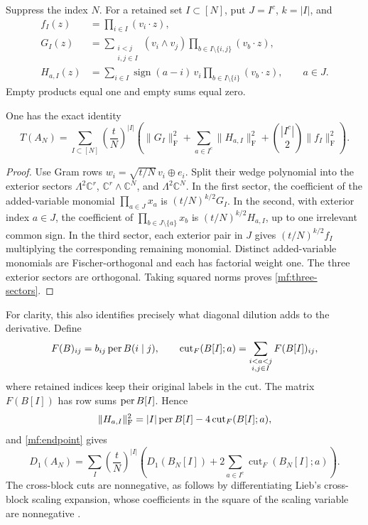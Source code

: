 Suppress the index \(N\). For a retained set \(I\subset[N]\), put
\(J=I^c\), \(k=|I|\), and
\begin{align*}
 f_I(z)&=\prod_{i\in I}(v_i\cdot z),\\
 G_I(z)&=\sum_{\substack{i<j\\i,j\in I}}
        (v_i\wedge v_j)\prod_{b\in I\setminus\{i,j\}}(v_b\cdot z),\\
 H_{a,I}(z)&=\sum_{i\in I}\operatorname{sign}(a-i)\,v_i
                       \prod_{b\in I\setminus\{i\}}(v_b\cdot z),
                       \qquad a\in J.
\end{align*}
Empty products equal one and empty sums equal zero.

\begin{lemma}\label{mf:sector-identity}
One has the exact identity
\begin{equation}\label{mf:three-sectors}
 T(A_N)=\sum_{I\subset[N]}\left(\frac tN\right)^{|I|}
 \left(
  \|G_I\|_{\mathrm F}^2+
  \sum_{a\in I^c}\|H_{a,I}\|_{\mathrm F}^2+
  \binom{|I^c|}{2}\|f_I\|_{\mathrm F}^2
 \right).
\end{equation}
\end{lemma}
\begin{proof}
Use Gram rows
\(w_i=\sqrt{t/N}\,v_i\oplus e_i\).
Split their wedge polynomial into the exterior sectors
\(\Lambda^2\mathbb C^r\), \(\mathbb C^r\wedge\mathbb C^N\), and
\(\Lambda^2\mathbb C^N\).
In the first sector, the coefficient of the added-variable monomial
\(\prod_{a\in J}x_a\) is \((t/N)^{k/2}G_I\).
In the second, with exterior index \(a\in J\), the coefficient of
\(\prod_{b\in J\setminus\{a\}}x_b\) is
\((t/N)^{k/2}H_{a,I}\), up to one irrelevant common sign.
In the third sector, each exterior pair in \(J\) gives
\((t/N)^{k/2}f_I\) multiplying the corresponding remaining monomial.
Distinct added-variable monomials are Fischer-orthogonal and each has
factorial weight one. The three exterior sectors are orthogonal.
Taking squared norms proves \eqref{mf:three-sectors}.
\end{proof}

For clarity, this also identifies precisely what diagonal dilution adds
to the derivative. Define
\[
 F(B)_{ij}=b_{ij}\operatorname{per} B(i\mid j),\qquad
 \operatorname{cut}_F(B[I];a)=
       \sum_{\substack{i<a<j\\i,j\in I}}F(B[I])_{ij},
\]
where retained indices keep their original labels in the cut.
The matrix \(F(B[I])\) has row sums \(\operatorname{per} B[I]\). Hence
\[
 \|H_{a,I}\|_{\mathrm F}^2
       =|I|\operatorname{per} B[I]-4\operatorname{cut}_F(B[I];a),
\]
and \eqref{mf:endpoint} gives
\begin{equation}\label{mf:derivative-dilution}
 D_1(A_N)=\sum_I\left(\frac tN\right)^{|I|}
 \left(D_1(B_N[I])
          +2\sum_{a\in I^c}\operatorname{cut}_F(B_N[I];a)\right).
\end{equation}
The cross-block cuts are nonnegative, as follows by differentiating
Lieb's cross-block scaling expansion, whose coefficients in the square
of the scaling variable are nonnegative \cite{Lieb1966}.

